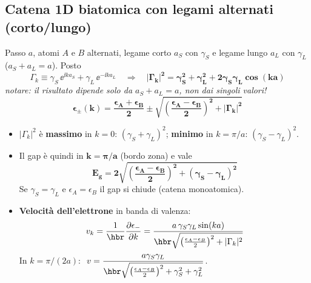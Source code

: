 \subsection{Catena 1D biatomica con legami alternati (corto/lungo)}
\label{sec:alternati}
Passo $a$, atomi $A$ e $B$ alternati, legame corto $a_S$ con $\gamma_S$ e legame lungo $a_L$ con $\gamma_L$ ($a_S+a_L=a$). Posto
\[ \Gamma_k \equiv \gamma_S\,\ee^{\ii k a_S} + \gamma_L\,\ee^{-\ii k a_L}
   \quad\Longrightarrow\quad
   \bm{|\Gamma_k|^2 = \gamma_S^2+\gamma_L^2+2\gamma_S\gamma_L\cos(ka)} \]
\textit{notare: il risultato dipende solo da $a_S+a_L=a$, non dai singoli valori!}
\[ \bm{\epsilon_\pm(k) = \frac{\epsilon_A+\epsilon_B}{2}\pm\sqrt{\left(\frac{\epsilon_A-\epsilon_B}{2}\right)^2+|\Gamma_k|^2}} \]
\begin{itemize}
  \item $|\Gamma_k|^2$ è \textbf{massimo} in $k=0$: $(\gamma_S+\gamma_L)^2$; \textbf{minimo} in $k=\pi/a$: $(\gamma_S-\gamma_L)^2$.
  \item Il gap è quindi in $\bm{k=\pi/a}$ (bordo zona) e vale
  \[ \bm{E_g = 2\sqrt{\left(\frac{\epsilon_A-\epsilon_B}{2}\right)^2 + (\gamma_S-\gamma_L)^2}} \]
  Se $\gamma_S=\gamma_L$ e $\epsilon_A=\epsilon_B$ il gap si chiude (catena monoatomica).
  \item \textbf{Velocità dell'elettrone} in banda di valenza:
  \[ v_k = \frac{1}{\hbr}\frac{\partial\epsilon_-}{\partial k}
        = \frac{a\,\gamma_S\gamma_L\sin(ka)}{\hbr\sqrt{\left(\frac{\epsilon_A-\epsilon_B}{2}\right)^2+|\Gamma_k|^2}} \]
  In $k=\pi/(2a)$: $\ \displaystyle v = \frac{a\gamma_S\gamma_L}{\hbr\sqrt{\left(\frac{\epsilon_A-\epsilon_B}{2}\right)^2+\gamma_S^2+\gamma_L^2}}$.
\end{itemize}

